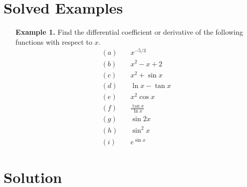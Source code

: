 

\section*{Solved Examples}

\begin{itemize}
  \item[\textbf{Example 1.}] Find the differential coefficient or derivative of the following functions with respect to \(x\).
  \begin{align*}
    (a) & \quad x^{-5/3} \\
    (b) & \quad x^2 - x + 2 \\
    (c) & \quad x^2 + \sin x \\
    (d) & \quad \ln x - \tan x \\
    (e) & \quad x^2 \cos x \\
    (f) & \quad \frac{\tan x}{\ln x} \\
    (g) & \quad \sin 2x \\
    (h) & \quad \sin^2 x \\
    (i) & \quad e^{\sin x}
  \end{align*}
\end{itemize}

\section*{Solution}

